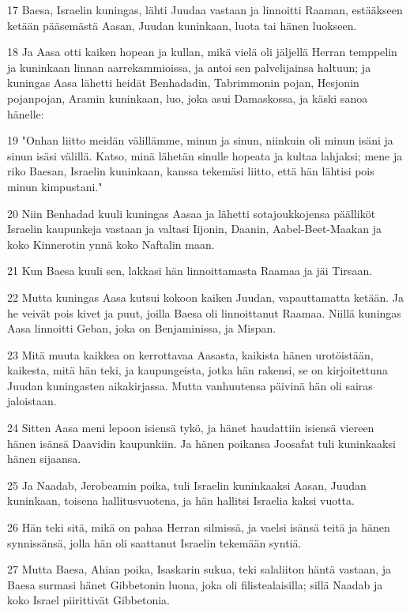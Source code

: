 \par 17 Baesa, Israelin kuningas, lähti Juudaa vastaan ja linnoitti Raaman, estääkseen ketään pääsemästä Aasan, Juudan kuninkaan, luota tai hänen luokseen.
\par 18 Ja Aasa otti kaiken hopean ja kullan, mikä vielä oli jäljellä Herran temppelin ja kuninkaan linnan aarrekammioissa, ja antoi sen palvelijainsa haltuun; ja kuningas Aasa lähetti heidät Benhadadin, Tabrimmonin pojan, Hesjonin pojanpojan, Aramin kuninkaan, luo, joka asui Damaskossa, ja käski sanoa hänelle:
\par 19 "Onhan liitto meidän välillämme, minun ja sinun, niinkuin oli minun isäni ja sinun isäsi välillä. Katso, minä lähetän sinulle hopeata ja kultaa lahjaksi; mene ja riko Baesan, Israelin kuninkaan, kanssa tekemäsi liitto, että hän lähtisi pois minun kimpustani."
\par 20 Niin Benhadad kuuli kuningas Aasaa ja lähetti sotajoukkojensa päälliköt Israelin kaupunkeja vastaan ja valtasi Iijonin, Daanin, Aabel-Beet-Maakan ja koko Kinnerotin ynnä koko Naftalin maan.
\par 21 Kun Baesa kuuli sen, lakkasi hän linnoittamasta Raamaa ja jäi Tirsaan.
\par 22 Mutta kuningas Aasa kutsui kokoon kaiken Juudan, vapauttamatta ketään. Ja he veivät pois kivet ja puut, joilla Baesa oli linnoittanut Raamaa. Niillä kuningas Aasa linnoitti Geban, joka on Benjaminissa, ja Mispan.
\par 23 Mitä muuta kaikkea on kerrottavaa Aasasta, kaikista hänen urotöistään, kaikesta, mitä hän teki, ja kaupungeista, jotka hän rakensi, se on kirjoitettuna Juudan kuningasten aikakirjassa. Mutta vanhuutensa päivinä hän oli sairas jaloistaan.
\par 24 Sitten Aasa meni lepoon isiensä tykö, ja hänet haudattiin isiensä viereen hänen isänsä Daavidin kaupunkiin. Ja hänen poikansa Joosafat tuli kuninkaaksi hänen sijaansa.
\par 25 Ja Naadab, Jerobeamin poika, tuli Israelin kuninkaaksi Aasan, Juudan kuninkaan, toisena hallitusvuotena, ja hän hallitsi Israelia kaksi vuotta.
\par 26 Hän teki sitä, mikä on pahaa Herran silmissä, ja vaelsi isänsä teitä ja hänen synnissänsä, jolla hän oli saattanut Israelin tekemään syntiä.
\par 27 Mutta Baesa, Ahian poika, Isaskarin sukua, teki salaliiton häntä vastaan, ja Baesa surmasi hänet Gibbetonin luona, joka oli filistealaisilla; sillä Naadab ja koko Israel piirittivät Gibbetonia.
